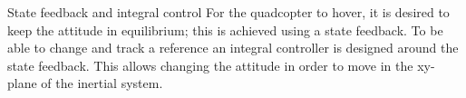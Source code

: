 State feedback and integral control
For the quadcopter to hover, it is desired to keep the attitude in equilibrium; this is achieved using a state feedback. To be able to change and track a reference an integral controller is designed around the state feedback. This allows changing the attitude in order to move in the xy-plane of the inertial system.












